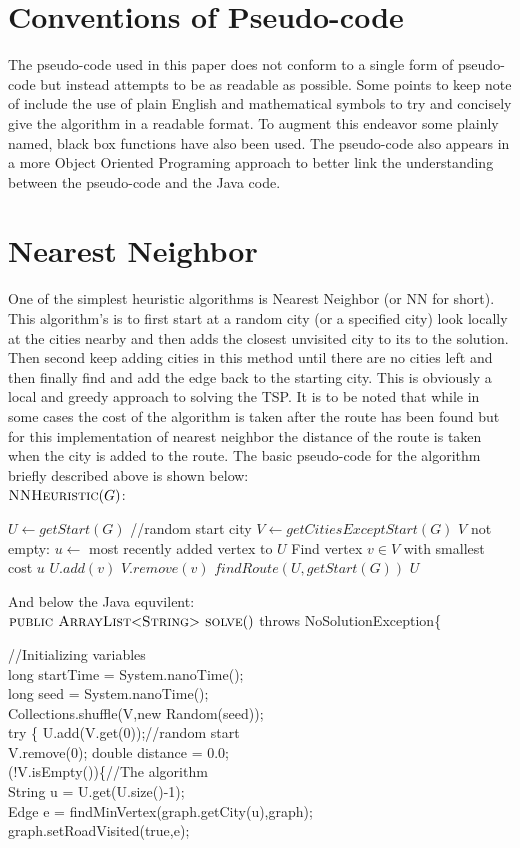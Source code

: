 \documentclass[midd]{thesis}
\newcommand{\tab}{\hspace*{2em}}
\begin{document}
\section{Conventions of Pseudo-code}
\tab The pseudo-code used in this paper does not conform to a single form of pseudo-code but instead attempts to be as readable as possible. Some points to keep note of include the use of plain English and mathematical symbols to try and concisely give the algorithm in a readable format. To augment this endeavor some plainly named, black box functions have also been used. The pseudo-code also appears in a more Object Oriented Programing approach to better link the understanding between the pseudo-code and the Java code.
\section{Nearest Neighbor}
\tab One of the simplest heuristic algorithms is Nearest Neighbor (or NN for short). This algorithm's is to first start at a random city (or a specified city) look locally at the cities nearby and then adds the closest unvisited city to its to the solution. Then second keep adding cities in this method until there are no cities left and then finally find and add the edge back to the starting city. This is obviously a local and greedy approach to solving the TSP. It is to be noted that while in some cases the cost of the algorithm is taken after the route has been found but for this implementation of nearest neighbor the distance of the route is taken when the city is added to the route. The basic pseudo-code for the algorithm briefly described above is shown below:\\
$\textnormal{\scshape NNHeuristic}(G)$:
\begin{codebox}
\li $U \gets getStart(G)$ //random start city
\li $V \gets getCitiesExceptStart(G)$
\li\While $V$ not empty:
\li $u \gets$ most recently added vertex to $U$
\li Find vertex $v \in V$ with smallest cost $u$
\li $U.add(v)$
\li $V.remove(v)$\End
\li $findRoute(U, getStart(G))$
\li\Return $U$
\end{codebox}
And below the Java equvilent:\\
$\textnormal{\scshape public ArrayList$<$String$>$ solve}()$ throws NoSolutionException\{
\begin{codebox}
\tab//Initializing variables\\
\tab long startTime = System.nanoTime();\\
\tab long seed = System.nanoTime();\\
\tab Collections.shuffle(V,new Random(seed));\\
\tab try \{
\tab\tab U.add(V.get(0));//random start\\
\tab\tab V.remove(0); double distance = 0.0;\\
\tab\tab \While(!V.isEmpty())\{//The algorithm\\
\tab\tab\tab String u = U.get(U.size()-1);\\
\tab\tab\tab Edge e = findMinVertex(graph.getCity(u),graph);\\
\tab\tab\tab graph.setRoadVisited(true,e);\\
\end{codebox}
\end{document}
